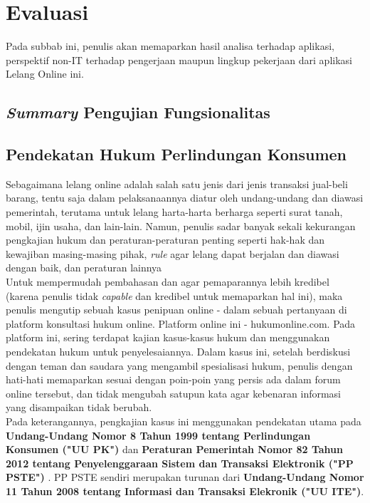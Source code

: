 \section{Evaluasi}
	Pada subbab ini, penulis akan memaparkan hasil analisa terhadap aplikasi, perspektif non-IT terhadap pengerjaan maupun lingkup pekerjaan dari aplikasi Lelang Online ini.
	
	\subsection{\textit{Summary} Pengujian Fungsionalitas}
	
	\subsection{Pendekatan Hukum Perlindungan Konsumen}
	
	Sebagaimana lelang online adalah salah satu jenis dari jenis transaksi jual-beli barang, tentu saja dalam pelaksanaannya diatur oleh undang-undang dan diawasi pemerintah, terutama untuk lelang harta-harta berharga seperti surat tanah, mobil, ijin usaha, dan lain-lain. Namun, penulis sadar banyak sekali kekurangan pengkajian hukum dan peraturan-peraturan penting seperti hak-hak dan kewajiban masing-masing pihak, \textit{rule} agar lelang dapat berjalan dan diawasi dengan baik, dan peraturan lainnya\\
	Untuk mempermudah pembahasan dan agar pemaparannya lebih kredibel (karena penulis tidak \textit{capable} dan kredibel untuk memaparkan hal ini), maka penulis mengutip sebuah kasus penipuan online - dalam sebuah pertanyaan di platform konsultasi hukum online. Platform online ini - hukumonline.com. Pada platform ini, sering terdapat kajian kasus-kasus hukum dan menggunakan pendekatan hukum untuk penyelesaiannya. Dalam kasus ini, setelah berdiskusi dengan teman dan saudara yang mengambil spesialisasi hukum, penulis dengan hati-hati memaparkan sesuai dengan poin-poin yang persis ada dalam forum online tersebut, dan tidak mengubah satupun kata agar kebenaran informasi yang disampaikan tidak berubah.\\
	\indent Pada keterangannya, pengkajian kasus ini menggunakan pendekatan utama pada \textbf{Undang-Undang Nomor 8 Tahun 1999 tentang Perlindungan Konsumen ("UU PK") } dan \textbf{Peraturan Pemerintah Nomor 82 Tahun 2012 tentang Penyelenggaraan Sistem dan Transaksi Elektronik ("PP PSTE") }. PP PSTE sendiri merupakan turunan dari \textbf{Undang-Undang Nomor 11 Tahun 2008 tentang Informasi dan Transaksi Elekronik ("UU ITE")}.
	
			
